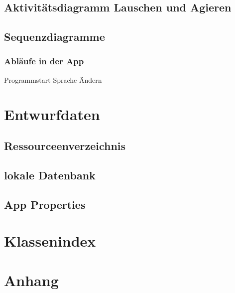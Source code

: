 \documentclass[a4paper,12pt]{article}
\begin{document}
\subsection{Aktivitätsdiagramm Lauschen und Agieren}
\subsection{Sequenzdiagramme}
\subsubsection{Abläufe in der App}
Programmstart
Sprache Ändern
\section{Entwurfdaten}
\subsection{Ressourceenverzeichnis}
\subsection{lokale Datenbank}
\subsection{App Properties}

\section{Klassenindex}
\section{Anhang}

\clearpage
\printglossaries
{}
\end{document}
